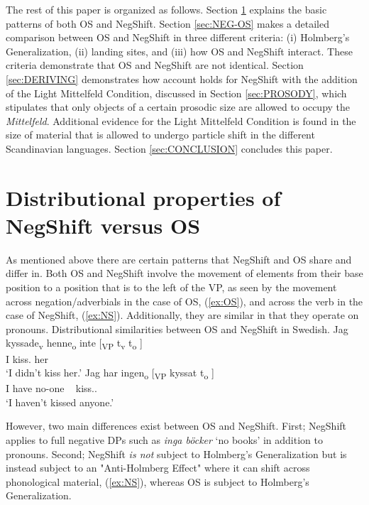 \documentclass[12pt, letterpaper]{article}
\begin{document}
The rest of this paper is organized as follows. Section \ref{sec:DISTRIBUTION} explains the basic patterns of both OS and NegShift. Section \ref{sec:NEG-OS} makes a detailed comparison between OS and NegShift in three different criteria: (i) Holmberg's Generalization, (ii) landing sites, and (iii) how OS and NegShift interact. These criteria demonstrate that OS and NegShift are not identical. Section \ref{sec:DERIVING} demonstrates how  account holds for NegShift with the addition of the Light Mittelfeld Condition, discussed in Section \ref{sec:PROSODY}, which stipulates that only objects of a certain prosodic size are allowed to occupy the \emph{Mittelfeld}. Additional evidence for the Light Mittelfeld Condition is found in the size of material that is allowed to undergo particle shift in the different Scandinavian languages. Section \ref{sec:CONCLUSION} concludes this paper.

\section{Distributional properties of NegShift versus OS} \label{sec:DISTRIBUTION}

As mentioned above there are certain patterns that NegShift and OS share and differ in. Both OS and NegShift involve the movement of elements from their base position to a position that is to the left of the VP, as seen by the movement across negation/adverbials in the case of OS, (\ref{ex:OS}), and across the verb in the case of NegShift, (\ref{ex:NS}). Additionally, they are similar in that they operate on pronouns. 
	\ea Distributional similarities between OS and NegShift in Swedish.
		\ea \label{ex:OS}
		\gll Jag kyssade\textsubscript{v} henne\textsubscript{o} inte [\textsubscript{VP} t\textsubscript{v} t\textsubscript{o} ] \\
		I kiss.\Pst{} her \Neg{}\\
		\glt `I didn't kiss her.'
		\ex \label{ex:NS}
		\gll Jag har ingen\textsubscript{o} [\textsubscript{VP} kyssat t\textsubscript{o} ]\\
		I have no-one ~ kiss.\Pst{}.\Ptcp{} \\
		\glt `I haven't kissed anyone.'
		\z 
	\z 

However, two main differences exist between OS and NegShift. First; NegShift applies to full negative DPs such as \textit{inga böcker} `no books' in addition to pronouns. Second; NegShift \emph{is not} subject to Holmberg's Generalization but is instead subject to an "Anti-Holmberg Effect" where it can shift across phonological material, (\ref{ex:NS}), whereas OS is subject to Holmberg's Generalization. 
\end{document}
